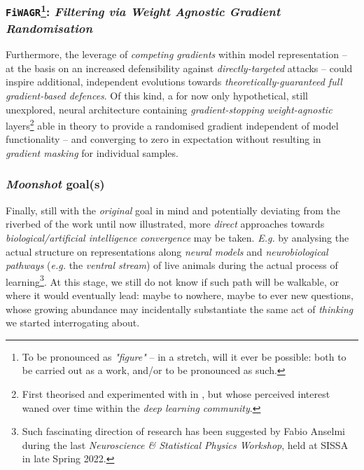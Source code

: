 \subsubsection[\texttt{FiWAGR}: \textit{Filtering via Weight Agnostic Gradient Randomisation}]{\texttt{FiWAGR}\protect\footnote{To be pronounced as \textit{"figure"} -- in a stretch, will it ever be possible: both to be carried out as a work, and/or to be pronounced as such.}: \textit{Filtering via Weight Agnostic Gradient Randomisation}}

Furthermore, the leverage of \textit{competing gradients} within model representation -- at the basis on an increased defensibility against \textit{directly-targeted} attacks -- could inspire additional, independent evolutions towards \textit{theoretically-guaranteed full gradient-based defences}. Of this kind, a for now only hypothetical, still unexplored, neural architecture containing \textit{gradient-stopping} \textit{weight-agnostic} layers\footnote{First theorised and experimented with in \cite{GaierHa2019WANNs}, but whose perceived interest waned over time within the \textit{deep learning community}.} able in theory to provide a randomised gradient independent of model functionality -- and converging to zero in expectation without resulting in \textit{gradient masking} for individual samples.

\subsubsection{\textit{Moonshot} goal(s)}

Finally, still with the \textit{original} goal in mind and potentially deviating from the riverbed of the work until now illustrated, more \textit{direct} approaches towards \textit{biological/artificial intelligence convergence} may be taken. \textit{E.g.} by analysing the actual structure on representations along \textit{neural models} and \textit{neurobiological pathways} (\textit{e.g.} the \textit{ventral stream}) of live animals during the actual process of learning\footnote{Such fascinating direction of research has been suggested by Fabio Anselmi during the last \textit{Neuroscience \& Statistical Physics Workshop}, held at SISSA in late Spring 2022.}. At this stage, we still do not know if such path will be walkable, or where it would eventually lead: maybe to nowhere, maybe to ever new questions, whose growing abundance may incidentally substantiate the same act of \textit{thinking} we started interrogating about.
